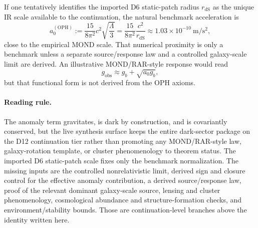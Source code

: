 If one tentatively identifies the imported D6 static-patch radius \(r_{\mathrm{dS}}\) as the
unique IR scale available to the continuation, the natural benchmark acceleration is
\[
a_0^{(\mathrm{OPH})}
:=
\frac{15}{8\pi^2}c^2\sqrt{\frac{\Lambda}{3}}
=
\frac{15}{8\pi^2}\frac{c^2}{r_{\mathrm{dS}}}
\approx
1.03\times 10^{-10}\ \mathrm{m/s^2},
\]
close to the empirical MOND scale. That numerical proximity is only a benchmark unless a separate
source/response law and a controlled galaxy-scale limit are derived. An illustrative MOND/RAR-style response would read
\[
g_{\mathrm{obs}}\approx g_b+\sqrt{a_0 g_b},
\]
but that functional form is not derived from the OPH axioms.

\paragraph{\textbf{Reading rule.}}
The anomaly term gravitates, is dark by construction, and is covariantly conserved, but the live
synthesis surface keeps the entire dark-sector package on the D12 continuation tier rather than
promoting any MOND/RAR-style law, galaxy-rotation template, or cluster phenomenology to theorem
status. The imported D6 static-patch scale fixes only the benchmark normalization. The missing
inputs are the controlled nonrelativistic limit, derived sign and closure control for the
effective anomaly contribution, a derived source/response law, proof of the relevant dominant
galaxy-scale source, lensing and cluster phenomenology, cosmological abundance and
structure-formation checks, and environment/stability bounds. Those are continuation-level
branches above the identity written here.
